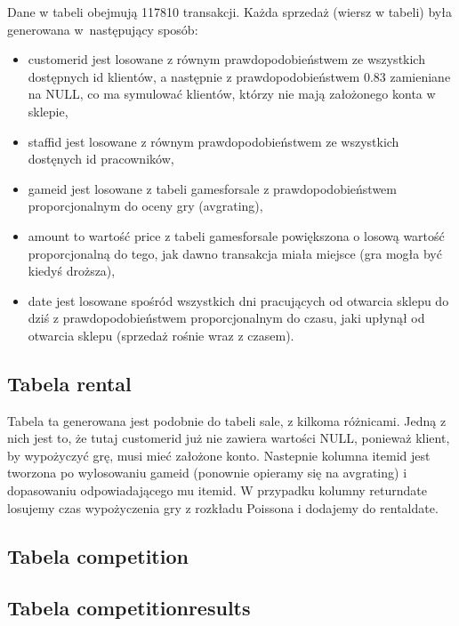\documentclass{article}
\begin{document}
		\noindent Dane w tabeli obejmują 117810 transakcji. Każda sprzedaż (wiersz w tabeli) była generowana w~następujący sposób:
		\begin{itemize}
			\setlength{\itemsep}{-2pt}
			\item customer\textunderscore id jest losowane z równym prawdopodobieństwem ze wszystkich dostępnych id klientów, a następnie z prawdopodobieństwem 0.83 zamieniane na NULL, co ma symulować klientów, którzy nie mają założonego konta w sklepie,
			\item staff\textunderscore id jest losowane z równym prawdopodobieństwem ze wszystkich dostęnych id pracowników,
			\item game\textunderscore id jest losowane z tabeli games\textunderscore for\textunderscore sale z prawdopodobieństwem proporcjonalnym do oceny gry (avg\textunderscore rating),
			\item amount to wartość price z tabeli games\textunderscore for\textunderscore sale powiększona o losową wartość proporcjonalną do tego, jak dawno transakcja miała miejsce (gra mogła być kiedyś droższa),
			\item date jest losowane spośród wszystkich dni pracujących od otwarcia sklepu do dziś z prawdopodobieństwem proporcjonalnym do czasu, jaki upłynął od otwarcia sklepu (sprzedaż rośnie wraz z czasem).
		\end{itemize}

	
	\subsection{Tabela rental}
        Tabela ta generowana jest podobnie do tabeli sale, z kilkoma różnicami. Jedną z nich jest to, że tutaj customer\textunderscore id już nie zawiera wartości NULL, ponieważ klient, by wypożyczyć grę, musi mieć założone konto. Nastepnie kolumna item\textunderscore id jest tworzona po wylosowaniu game\textunderscore id (ponownie opieramy się na avg\textunderscore rating) i dopasowaniu odpowiadającego mu item\textunderscore id. W przypadku kolumny return\textunderscore date losujemy czas wypożyczenia gry z rozkładu Poissona i dodajemy do rental\textunderscore date.

	
	\subsection{Tabela competition}
	
	\subsection{Tabela competition\textunderscore results}
	
\end{document}
